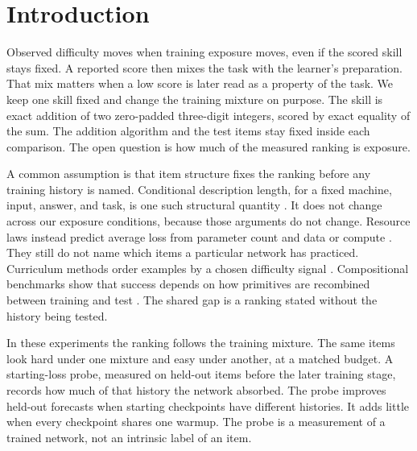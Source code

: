 \section{Introduction}
Observed difficulty moves when training exposure moves, even if the scored skill stays fixed.
A reported score then mixes the task with the learner's preparation.
That mix matters when a low score is later read as a property of the task.
We keep one skill fixed and change the training mixture on purpose.
The skill is exact addition of two zero-padded three-digit integers, scored by exact equality of the sum.
The addition algorithm and the test items stay fixed inside each comparison.
The open question is how much of the measured ranking is exposure.

A common assumption is that item structure fixes the ranking before any training history is named.
Conditional description length, for a fixed machine, input, answer, and task, is one such structural quantity \citep{kolmogorov1968three,grunwald2008algorithmic}.
It does not change across our exposure conditions, because those arguments do not change.
Resource laws instead predict average loss from parameter count and data or compute \citep{kaplan2020scaling,hoffmann2022chinchilla}.
They still do not name which items a particular network has practiced.
Curriculum methods order examples by a chosen difficulty signal \citep{bengio2009curriculum}.
Compositional benchmarks show that success depends on how primitives are recombined between training and test \citep{lake2018generalization,keysers2020measuring}.
The shared gap is a ranking stated without the history being tested.

In these experiments the ranking follows the training mixture.
The same items look hard under one mixture and easy under another, at a matched budget.
A starting-loss probe, measured on held-out items before the later training stage, records how much of that history the network absorbed.
The probe improves held-out forecasts when starting checkpoints have different histories.
It adds little when every checkpoint shares one warmup.
The probe is a measurement of a trained network, not an intrinsic label of an item.

